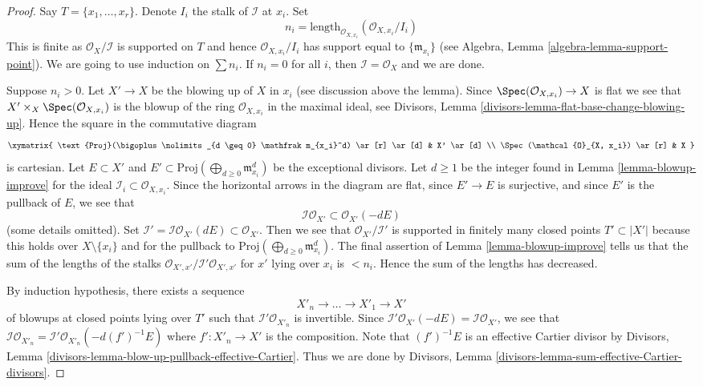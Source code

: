\begin{proof}
Say $T = \{x_1, \ldots, x_r\}$. Denote $I_i$ the stalk of $\mathcal{I}$ at
$x_i$. Set
$$
n_i = \text{length}_{\mathcal{O}_{X, x_i}}(\mathcal{O}_{X, x_i}/I_i)
$$
This is finite as $\mathcal{O}_X/\mathcal{I}$ is supported on $T$
and hence $\mathcal{O}_{X, x_i}/I_i$ has support equal to
$\{\mathfrak m_{x_i}\}$ (see Algebra, Lemma \ref{algebra-lemma-support-point}).
We are going to use induction on $\sum n_i$. If $n_i = 0$ for all
$i$, then $\mathcal{I} = \mathcal{O}_X$ and we are done.

\medskip\noindent
Suppose $n_i > 0$. Let $X' \to X$ be the blowing up of $X$ in $x_i$
(see discussion above the lemma).
Since $\Spec(\mathcal{O}_{X, x_i}) \to X$ is flat we see that
$X' \times_X \Spec(\mathcal{O}_{X, x_i})$ is the blowup of
the ring $\mathcal{O}_{X, x_i}$ in the maximal ideal, see
Divisors, Lemma
\ref{divisors-lemma-flat-base-change-blowing-up}.
Hence the square in the commutative diagram
$$
\xymatrix{
\text{Proj}(\bigoplus\nolimits_{d \geq 0} \mathfrak m_{x_i}^d) \ar[r] \ar[d] &
X' \ar[d] \\
\Spec(\mathcal{O}_{X, x_i}) \ar[r] & X
}
$$
is cartesian. Let $E \subset X'$ and
$E' \subset \text{Proj}(\bigoplus\nolimits_{d \geq 0} \mathfrak m_{x_i}^d)$
be the exceptional divisors. Let $d \geq 1$ be the integer found in
Lemma \ref{lemma-blowup-improve} for the ideal
$\mathcal{I}_i \subset \mathcal{O}_{X, x_i}$.
Since the horizontal arrows in the diagram are flat, since
$E' \to E$ is surjective, and since $E'$ is the pullback of $E$, we see that
$$
\mathcal{I}\mathcal{O}_{X'} \subset \mathcal{O}_{X'}(-dE)
$$
(some details omitted).
Set $\mathcal{I}' = \mathcal{I}\mathcal{O}_{X'}(dE) \subset \mathcal{O}_{X'}$.
Then we see that $\mathcal{O}_{X'}/\mathcal{I}'$ is supported in finitely
many closed points $T' \subset |X'|$ because this holds over
$X \setminus \{x_i\}$ and for the pullback to
$\text{Proj}(\bigoplus\nolimits_{d \geq 0} \mathfrak m_{x_i}^d)$.
The final assertion of Lemma \ref{lemma-blowup-improve}
tells us that the sum of the lengths of the stalks
$\mathcal{O}_{X', x'}/\mathcal{I}'\mathcal{O}_{X', x'}$
for $x'$ lying over $x_i$ is $< n_i$. Hence the sum of the lengths
has decreased.

\medskip\noindent
By induction hypothesis, there exists a sequence
$$
X'_n \to \ldots \to X'_1 \to X'
$$
of blowups at closed points lying over $T'$ such that
$\mathcal{I}'\mathcal{O}_{X'_n}$ is invertible. Since
$\mathcal{I}'\mathcal{O}_{X'}(-dE) = \mathcal{I}\mathcal{O}_{X'}$, we see
that $\mathcal{I}\mathcal{O}_{X'_n} =
\mathcal{I}'\mathcal{O}_{X'_n}(-d(f')^{-1}E)$
where $f' : X'_n \to X'$ is the composition.
Note that $(f')^{-1}E$ is an effective Cartier divisor by
Divisors, Lemma \ref{divisors-lemma-blow-up-pullback-effective-Cartier}.
Thus we are done by
Divisors, Lemma \ref{divisors-lemma-sum-effective-Cartier-divisors}.
\end{proof}

